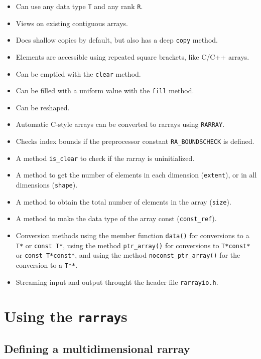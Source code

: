 \documentclass[11pt,twoside]{article}
\begin{document}
\begin{itemize}\itemsep0pt\parskip2pt
\item Can use any data type {\tt T} and any rank {\tt R}.
\item Views on existing contiguous arrays.
\item Does shallow copies by default, but also has a deep {\tt copy} method.
\item Elements are accessible using repeated square brackets, like C/C++ arrays.
\item Can be emptied with the {\tt clear} method.
\item Can be filled with a uniform value with the {\tt fill} method.
\item Can be reshaped.
\item Automatic C-style arrays can be converted to rarrays using {\tt RARRAY}.
\item Checks index bounds if the preprocessor
  constant {\tt RA\_BOUNDSCHECK} is defined. 
\item A method {\tt is\_clear} to check if the rarray is uninitialized.
\item A method to get the number of elements in each
  dimension (\texttt{extent}), or in all dimensions (\texttt{shape}).
\item A method to obtain the total number of elements in the
  array (\texttt{size}).
\item A method to make the data type of the array const
  (\texttt{const\_ref}).
\item Conversion methods using the member
  function \texttt{data()} for conversions to a \texttt{T*} or
  \texttt{const T*}, using the method \texttt{ptr\_array()} for
  conversions to \texttt{T*const*} or \texttt{const T*const*}, and
  using the method \texttt{noconst\_ptr\_array()} for the conversion to a
  \texttt{T**}.
\item Streaming input and output throught the header file \texttt{rarrayio.h}.
\end{itemize}

\section{Using the {\tt rarray}s}

\subsection{Defining a multidimensional rarray}
\end{document}
